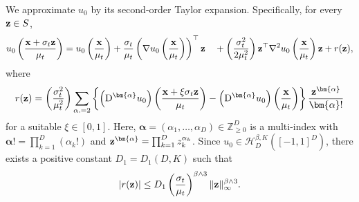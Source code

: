 \documentclass[11pt,a4paper,final]{article}
\numberwithin{equation}{section}
\theoremstyle{remark}
\def\cH{\mathcal H}
\newcommand{\bx}{{\bf x}}
\newcommand{\bz}{{\bf z}}
\newcommand{\bbZ}{{\mathbb Z}}
\newcommand{\balpha}{\bm{\alpha}}
\newcommand{\be}{\begin{equation}}
\newcommand{\ee}{\end{equation}}
\newcommand{\bean}{\setlength\arraycolsep{1pt}\begin{eqnarray*}}
\newcommand{\eean}{\end{eqnarray*}}
\def\D{{\rm D}}
\begin{document}
We approximate $u_0$ by its second-order Taylor expansion.
Specifically, for every $\bz \in S$,
\be
 u_0 \left( \frac{\bx + \sigma_t \bz}{\mu_t} \right)
=  u_0 \left( \frac{\bx}{\mu_t} \right)
 +  \frac{\sigma_t}{\mu_t}  \left( \nabla u_0 \left( \frac{\bx}{\mu_t} \right) \right)^{\top} \bz
 \quad + \left( \frac{\sigma_t^2}{2 \mu_t^2} \right)  \bz^{\top}  \nabla^2 u_0 \left( \frac{\bx}{\mu_t} \right) \bz
 + r(\bz),
 \label{eqthm1:qd_approx}
\ee
where
\bean
r(\bz) = \left( \frac{\sigma_t^2}{\mu_t^2} \right) \sum_{ \alpha. = 2} \left\{ \left( \D^{\balpha} u_0 \right) \left( \frac{\bx + \xi \sigma_t \bz}{\mu_t} \right) - \left( \D^{\balpha} u_0 \right) \left( \frac{\bx}{\mu_t} \right) \right\} \frac{ \bz^{\balpha} }{\balpha !}
\eean
for a suitable $\xi \in [0,1]$.
Here, $\balpha = (\alpha_1,\ldots,\alpha_{D}) \in \bbZ_{\geq 0}^{D}$ is a multi-index with $\balpha! = \prod_{k=1}^{D} ( \alpha_k! ) $ and $\bz^{\balpha} = \prod_{k=1}^{D} z_k^{\alpha_k}$.
Since $u_0 \in  \cH^{\beta,K}_{D}([-1,1]^{D})$, there exists a positive constant $D_{1} = D_{1} (D,K)$ such that
\be
\vert r(\bz) \vert \leq D_{1} \left( \frac{\sigma_t}{\mu_t} \right)^{\beta \wedge 3} \| \bz \|_{\infty}^{\beta \wedge 3}.
\label{eqthm1:rem}
\ee
\end{document}
